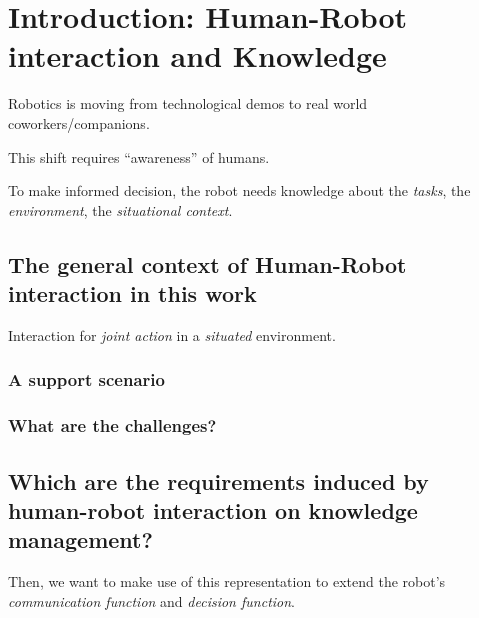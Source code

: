 \chapter{Introduction: Human-Robot interaction and Knowledge}
\label{chapter|introduction}

Robotics is moving from technological demos to real world coworkers/companions.

This shift requires ``awareness'' of humans.

To make informed decision, the robot needs knowledge about the \emph{tasks},
the \emph{environment}, the \emph{situational context}.

\section{The general context of Human-Robot interaction in this work}
\label{sect|general-context}

Interaction for \emph{joint action} in a \emph{situated} environment.

\subsection{A support scenario}
\label{sect|scenario}



\subsection{What are the challenges?}
\label{sect|scenario-challenges}


\section{Which are the requirements induced by human-robot interaction on knowledge management?}
\label{sect|krs-requirements-hri}

Then, we want to make use of this representation to extend the robot's
\emph{communication function} and \emph{decision function}.


